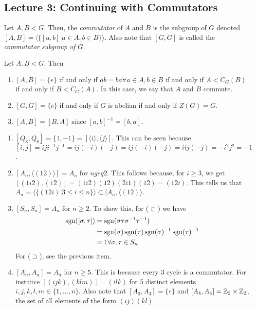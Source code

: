 \documentclass[11pt,leqno,oneside]{amsart}
\newcommand{\subgroup}{\mathrel{<}}
\begin{document}
\subsection*{Lecture 3: Continuing with Commutators}
\begin{defn}
    Let $A, B \subgroup G$. Then, the \emph{commutator} of $A$ and $B$ is the
    subgroup of $G$ denoted $[A,B] = \langle \{[a,b] | a \in A, b \in B\}
    \rangle$. Also note that $[G,G]$ is called the \emph{commutator subgroup of
    $G$}.
\end{defn}
\begin{rmk}
    Let $A,B \subgroup G$. Then
    \begin{enumerate}
        \item $[A,B] = \{e\}$ if and only if $ab = ba \forall a \in A, b \in B$
            if and only if $A \subgroup C_G(B)$ if and only if $B \subgroup
            C_G(A)$. In this case, we say that $A$ and $B$ commute.
        \item $[G,G] = \{e\}$ if and only if $G$ is abelian if and only if $Z(G) = G$.
        \item $[A,B] = [B,A]$ since $[a,b]^{-1} = [b,a]$.
    \end{enumerate}
\end{rmk}
\begin{example}
    \begin{enumerate}
        \item $[Q_8,Q_8] = \{1,-1\} = [\langle i \rangle, \langle j \rangle]$.
            This can be seen because $[i,j] = iji^{-1}j^{-1} = ij(-i)(-j) =
            ij(-i)(-j) = iij(-j) = -i^2j^2 = -1$.
        \item $[A_n, \langle (12) \rangle] = A_n$ for $n geq 2$. This follows
            because, for $i \geq 3$, we get $[(1i2),(12)] = (1i2)(12)(2i1)(12)
            = (12i)$. This tells us that $A_n = \langle \{(12i) | 3 \leq i \leq
            n\} \rangle \subset [A_n, \langle (12)\rangle$.
        \item $[S_n,S_n] = A_n$ for $n \geq 2$. To show this, for ($\subset$)
            we have \begin{align*}
                \operatorname{sgn}( [\sigma,\tau] ) & = \operatorname{sgn}(\sigma \tau \sigma^{-1} \tau^{-1}) \\
                \ & = \operatorname{sgn}(\sigma) \operatorname{sgn}(\tau) \operatorname{sgn}(\sigma)^{-1} \operatorname{sgn}(\tau)^{-1} \\
                \ & = 1 \forall \sigma, \tau \in S_n
            \end{align*}
            For ($\supset$), see the previous item.
        \item $[A_n,A_n] = A_n$ for $n \geq 5$. This is because every 3 cycle
            is a commutator. For instance $[(ijk),(klm)] = (ilk)$ for 5
            distinct elements $i,j,k,l,m \in \{1, \ldots, n\}$. Also note that
            $[A_3,A_3] = \{e\}$ and $[A_4,A_4] = {\mathbb Z}_2 \times {\mathbb Z}_2$, the set of
            all elements of the form $(ij)(kl)$.
    \end{enumerate}
\end{example}
\end{document}
